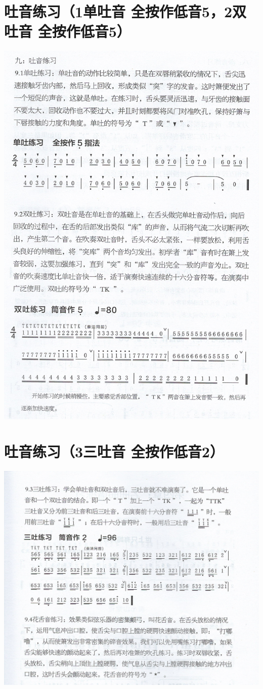\documentclass[cn,pad,chinese,chinesefont=nofont]{elegantbook}
\begin{document}
\section{吐音练习（1单吐音 全按作低音5，2双吐音 全按作低音5）}
\includegraphics[height=\textheight]{dongxiao/Scan 15.jpeg}

\section{吐音练习（3三吐音 全按作低音2）}
\includegraphics[width=\textwidth]{dongxiao/Scan 16-1.jpeg}
\end{document}
